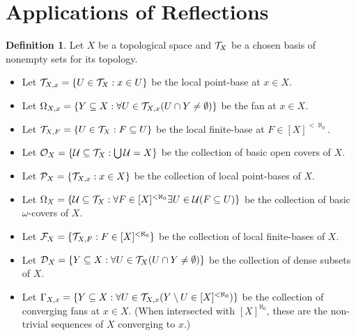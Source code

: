 \documentclass{amsart}
\theoremstyle{plain}
\theoremstyle{definition}
\newtheorem{definition}[theorem]{Definition}
\theoremstyle{remark}
\theoremstyle{plain}
\theoremstyle{definition}
\theoremstyle{remark}
\begin{document}
\section{Applications of Reflections}

\begin{definition}\label{selectionSets}
  Let \(X\) be a topological space and \(\mathcal{T}_X\) be a chosen basis of nonempty sets for its topology.
  \begin{itemize}
    \item Let \(\mathcal{T}_{X,x} = \{U\in\mathcal{T}_X : x\in U\}\) be the local point-base at \(x\in X\).
    \item Let \(\Omega_{X,x} = \{Y\subseteq X: \forall U\in\mathcal{T}_{X,x}(U\cap Y\not=\emptyset)\}\) be the fan at \(x\in X\).
    \item Let \(\mathcal{T}_{X,F} = \{U\in\mathcal{T}_X : F\subseteq U\}\) be the local finite-base at \(F\in[X]^{<\aleph_0}\).
    \item Let \(\mathcal{O}_X = \{\mathcal{U}\subseteq\mathcal{T}_X : \bigcup \mathcal{U}=X\}\) be the collection
          of basic open covers of \(X\).
    \item Let \(\mathcal{P}_X = \{\mathcal{T}_{X,x} : x\in X\}\) be the collection of local point-bases of \(X\).
    \item Let \(\Omega_X = \{\mathcal{U}\subseteq\mathcal{T}_X : \forall F\in[X]^{<\aleph_0}\exists U\in\mathcal{U}(F\subseteq U)\}\)
          be the collection of basic \(\omega\)-covers of \(X\).
    \item Let \(\mathcal{F}_X = \{\mathcal{T}_{X,F} : F\in [X]^{<\aleph_0}\}\) be the collection of local finite-bases of \(X\).
    \item Let \(\mathcal{D}_X = \{Y\subseteq X: \forall U\in\mathcal{T}_X(U\cap Y\not=\emptyset)\}\) be the collection of dense subsets of \(X\).
    \item Let \(\Gamma_{X,x} = \{Y\subseteq X: \forall U\in\mathcal{T}_{X,x}(Y\setminus U\in[X]^{<\aleph_0})\}\) be the collection
          of converging fans at \(x\in X\). (When intersected with \([X]^{\aleph_0}\), these are the non-trivial
          sequences of \(X\) converging to \(x\).)
  \end{itemize}
\end{definition}
\end{document}

